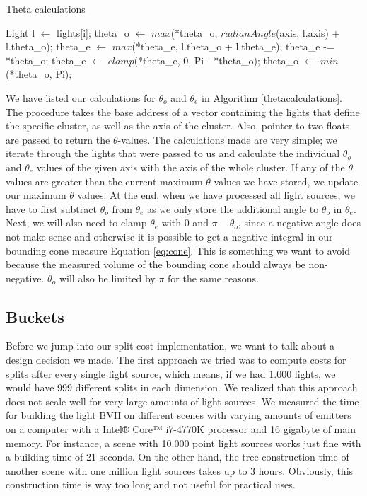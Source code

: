 \begin{algorithm}
	\caption{Theta calculations}
	\label{thetacalculations}
	\begin{algorithmic}[1] %
			\State Light l $\gets$ lights[i];
			\State 	*theta\_o $\gets$ $max$(*theta\_o, $radianAngle$(axis, l.axis) + l.theta\_o);
			\State *theta\_e $\gets$ $max$(*theta\_e, l.theta\_o + l.theta\_e);
		\EndFor
		\State *theta\_e -= *theta\_o;
		\State *theta\_e $\gets$ $clamp$(*theta\_e, 0, Pi - *theta\_o);
		\State *theta\_o $\gets$ $min$(*theta\_o, Pi);
		\EndProcedure
	\end{algorithmic}
\end{algorithm}

We have listed our calculations for $\theta_o$ and $\theta_e$ in Algorithm \ref{thetacalculations}. The procedure takes the base address of a vector containing the lights that define the specific cluster, as well as the axis of the cluster. Also, pointer to two floats are passed to return the $\theta$-values. The calculations made are very simple; we iterate through the lights that were passed to us and calculate the individual $\theta_o$ and $\theta_e$ values of the given axis with the axis of the whole cluster. If any of the $\theta$ values are greater than the current maximum $\theta$ values we have stored, we update our maximum $\theta$ values. At the end, when we have processed all light sources, we have to first subtract $\theta_o$ from $\theta_e$ as we only store the additional angle to $\theta_o$ in $\theta_e$. Next, we will also need to clamp $\theta_e$ with 0 and $\pi - \theta_o$, since a negative angle does not make sense and otherwise it is possible to get a negative integral in our bounding cone measure Equation \ref{eq:cone}. This is something we want to avoid because the measured volume of the bounding cone should always be non-negative. $\theta_o$ will also be limited by $\pi$ for the same reasons.

\subsection{Buckets}
\label{subs:buckets}

Before we jump into our split cost implementation, we want to talk about a design decision we made. The first approach we tried was to compute costs for splits after every single light source, which means, if we had 1.000 lights, we would have 999 different splits in each dimension. We realized that this approach does not scale well for very large amounts of light sources. We measured the time for building the light BVH on different scenes with varying amounts of emitters on a computer with a Intel® Core™ i7-4770K processor and 16 gigabyte of main memory. For instance, a scene with 10.000 point light sources works just fine with a building time of 21 seconds. On the other hand, the tree construction time of another scene with one million light sources takes up to 3 hours. Obviously, this construction time is way too long and not useful for practical uses. 

